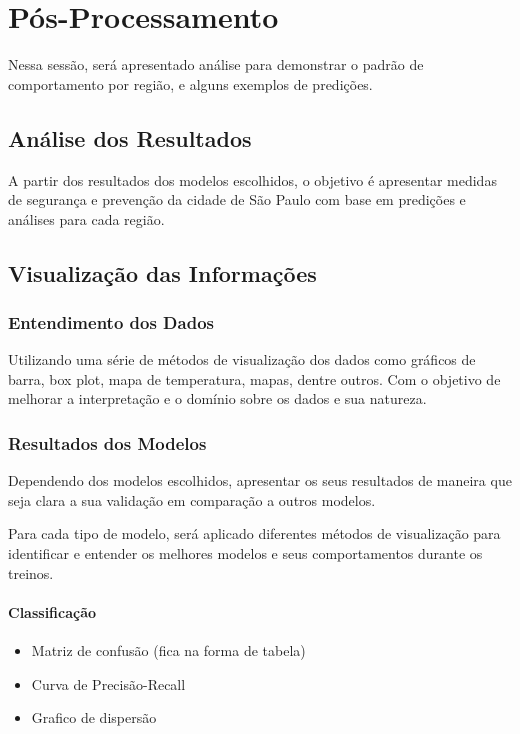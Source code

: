 \documentclass[a4paper,12pt]{article}
\begin{document}
\section{Pós-Processamento}

Nessa sessão, será apresentado análise para demonstrar o padrão de comportamento por região, e alguns exemplos de predições.

\subsection{Análise dos Resultados}

A partir dos resultados dos modelos escolhidos, o objetivo é apresentar medidas de segurança e prevenção da cidade de São Paulo com base em predições e análises para cada região.

\subsection{Visualização das Informações}

\subsubsection{Entendimento dos Dados}

Utilizando uma série de métodos de visualização dos dados como gráficos de barra, box plot, mapa de temperatura, mapas, dentre outros. Com o objetivo de melhorar a interpretação e o domínio sobre os dados e sua natureza.

\subsubsection{Resultados dos Modelos}

Dependendo dos modelos escolhidos, apresentar os seus resultados de maneira que seja clara a sua validação em comparação a outros modelos.

Para cada tipo de modelo, será aplicado diferentes métodos de visualização para identificar e entender os melhores modelos e seus comportamentos durante os treinos.

\paragraph{Classificação}
\begin{itemize}
    \item Matriz de confusão (fica na forma de tabela)
    \item Curva de Precisão-Recall
    \item Grafico de dispersão
\end{itemize}
\end{document}
